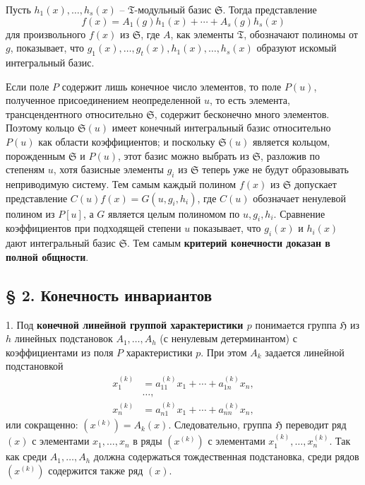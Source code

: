 \documentclass[11pt]{article}
\begin{document}
Пусть $h_1(x),\ldots,h_s(x)$ -- $\mathfrak T$-модульный базис $\mathfrak S$. Тогда представление
\[
 f(x)=A_1(g)h_1(x)+\cdots+A_s(g)h_s(x)
\]
для произвольного $f(x)$ из $\mathfrak S$, где $A$, как элементы $\mathfrak T$, обозначают полиномы от $g$, показывает, что $g_1(x),\ldots,g_t(x),h_1(x),\ldots,h_s(x)$ образуют искомый интегральный базис.

Если поле $P$ содержит лишь конечное число элементов, то поле $P(u)$, полученное присоединением неопределенной $u$, то есть элемента, трансцендентного относительно $\mathfrak S$, содержит бесконечно много элементов. Поэтому кольцо $\mathfrak S(u)$ имеет конечный интегральный базис относительно $P(u)$ как области коэффициентов; и поскольку $\mathfrak S(u)$ является кольцом, порожденным $\mathfrak S$ и $P(u)$, этот базис можно выбрать из $\mathfrak S$, разложив по степеням $u$, хотя базисные элементы $g_i$ из $\mathfrak S$ теперь уже не будут образовывать неприводимую систему. Тем самым каждый полином $f(x)$ из $\mathfrak S$ допускает представление $C(u)f(x)=G(u,g_i,h_i)$, где $C(u)$ обозначает ненулевой полином из $P[u]$, а $G$ является целым полиномом по $u,g_i,h_i$. Сравнение коэффициентов при подходящей степени $u$ показывает, что $g_i(x)$ и $h_i(x)$ дают интегральный базис $\mathfrak S$. Тем самым \textbf{критерий конечности доказан в полной общности}.

\subsection*{§ 2. Конечность инвариантов}

1. Под \textbf{конечной линейной группой характеристики $p$} понимается группа $\mathfrak H$ из $h$ линейных подстановок $A_1,\ldots,A_h$ (с ненулевым детерминантом) с коэффициентами из поля $P$ характеристики $p$. При этом $A_k$ задается линейной подстановкой
\[
\begin{aligned}
 x_1^{(k)}&=a_{11}^{(k)}x_1+\cdots+a_{1n}^{(k)}x_n,\\[-0.2em]
 &\ldots,\\
 x_n^{(k)}&=a_{n1}^{(k)}x_1+\cdots+a_{nn}^{(k)}x_n,
\end{aligned}
\]
или сокращенно: $(x^{(k)})=A_k(x)$. Следовательно, группа $\mathfrak H$ переводит ряд $(x)$ с элементами $x_1,\ldots,x_n$ в ряды $(x^{(k)})$ с элементами $x_1^{(k)},\ldots,x_n^{(k)}$. Так как среди $A_1,\ldots,A_h$ должна содержаться тождественная подстановка, среди рядов $(x^{(k)})$ содержится также ряд $(x)$.
\end{document}

